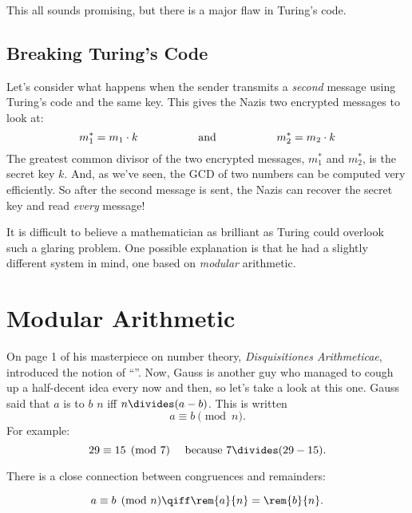This all sounds promising, but there is a major flaw in Turing's code.

\subsection{Breaking Turing's Code}

Let's consider what happens when the sender transmits a
\emph{second} message using Turing's code and the same key.  This
gives the Nazis two encrypted messages to look at:
%
\[
m_1^* = m_1 \cdot k
\hspace{0.75in} \text{and} \hspace{0.75in}
m_2^* = m_2 \cdot k
\]
%
The greatest common divisor of the two encrypted messages, $m_1^*$ and
$m_2^*$, is the secret key $k$.  And, as we've seen, the GCD of two
numbers can be computed very efficiently.  So after the second message is
sent, the Nazis can recover the secret key and read \emph{every}
message!

It is difficult to believe a mathematician as brilliant as Turing
could overlook such a glaring problem.  One possible explanation is
that he had a slightly different system in mind, one based on
\emph{modular} arithmetic.



\section{Modular Arithmetic}
\label{modular_arithmeric_sec}


On page 1 of his masterpiece on number theory, \emph{Disquisitiones
  Arithmeticae},  introduced the notion of
``''.  Now, Gauss is another guy who managed to cough up a
half-decent idea every now and then, so let's take a look at this one.
Gauss said that $a$ is  to $b$  $n$ iff $n
\divides (a - b)$.  This is written 
\[
a \equiv b \pmod{n}.
\]
For example:
%
\[
29 \equiv 15 \pmod{7}  \quad\text{ because }  7 \divides (29 - 15).
\]

There is a close connection between congruences and remainders:
\begin{lemma}
\label{lem:conrem}
\[
a \equiv b \pmod{n} \qiff \rem{a}{n} = \rem{b}{n}.
\]
\end{lemma}

